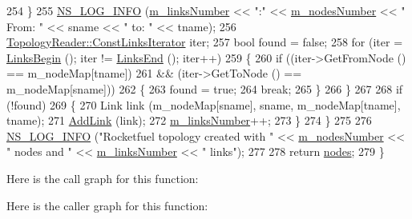 \begin{DoxyCode}
254         \}
255       \hyperlink{group__logging_gafbd73ee2cf9f26b319f49086d8e860fb}{NS\_LOG\_INFO} (\hyperlink{classns3_1_1RocketfuelTopologyReader_af05d006d96b5314535548ec5f6b82ecc}{m\_linksNumber} << \textcolor{stringliteral}{":"} << \hyperlink{classns3_1_1RocketfuelTopologyReader_a7e820cdd94908dc1665d0530d5566ada}{m\_nodesNumber} << \textcolor{stringliteral}{" From: "} 
      << sname << \textcolor{stringliteral}{" to: "} << tname);
256       \hyperlink{classns3_1_1TopologyReader_a13f936af0da10bb38b80bd23048bbe20}{TopologyReader::ConstLinksIterator} iter;
257       \textcolor{keywordtype}{bool} found = \textcolor{keyword}{false};
258       \textcolor{keywordflow}{for} (iter = \hyperlink{classns3_1_1TopologyReader_a5b102e7761470c8d798a45dff85c8396}{LinksBegin} (); iter != \hyperlink{classns3_1_1TopologyReader_a9169165a40b1acf2a4137b0f408fc8e6}{LinksEnd} (); iter++)
259         \{
260           \textcolor{keywordflow}{if} ((iter->GetFromNode () == m\_nodeMap[tname])
261               && (iter->GetToNode () == m\_nodeMap[sname]))
262             \{
263               found = \textcolor{keyword}{true};
264               \textcolor{keywordflow}{break};
265             \}
266         \}
267 
268       \textcolor{keywordflow}{if} (!found)
269         \{
270           Link link (m\_nodeMap[sname], sname, m\_nodeMap[tname], tname);
271           \hyperlink{classns3_1_1TopologyReader_a0ecbd003f3e4c0c142720b20b8cfcbeb}{AddLink} (link);
272           \hyperlink{classns3_1_1RocketfuelTopologyReader_af05d006d96b5314535548ec5f6b82ecc}{m\_linksNumber}++;
273         \}
274     \}
275 
276   \hyperlink{group__logging_gafbd73ee2cf9f26b319f49086d8e860fb}{NS\_LOG\_INFO} (\textcolor{stringliteral}{"Rocketfuel topology created with "} << \hyperlink{classns3_1_1RocketfuelTopologyReader_a7e820cdd94908dc1665d0530d5566ada}{m\_nodesNumber} << \textcolor{stringliteral}{" nodes and 
      "} << \hyperlink{classns3_1_1RocketfuelTopologyReader_af05d006d96b5314535548ec5f6b82ecc}{m\_linksNumber} << \textcolor{stringliteral}{" links"});
277 
278   \textcolor{keywordflow}{return} \hyperlink{visualizer-ideas_8txt_a3e1b3808014a2c68ab0cd0182e041be2}{nodes};
279 \}
\end{DoxyCode}


Here is the call graph for this function\+:




Here is the caller graph for this function\+:


